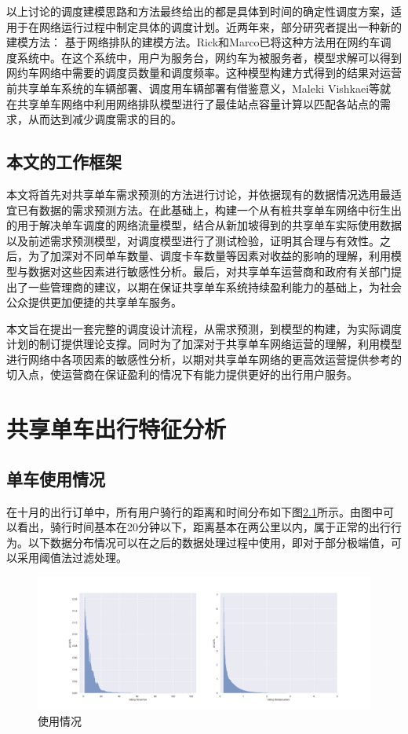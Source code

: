 \documentclass[]{tongjithesis}
\numberwithin{equation}{chapter}
\begin{document}
以上讨论的调度建模思路和方法最终给出的都是具体到时间的确定性调度方案，适用于在网络运行过程中制定具体的调度计划。近两年来，部分研究者提出一种新的建模方法： 基于网络排队的建模方法。Rick和Marco已将这种方法用在网约车调度系统中\cite{zhang2015queueing}。在这个系统中，用户为服务台，网约车为被服务者，模型求解可以得到网约车网络中需要的调度员数量和调度频率。这种模型构建方式得到的结果对运营前共享单车系统的车辆部署、调度用车辆部署有借鉴意义，Maleki Vishkaei等就在共享单车网络中利用网络排队模型进行了最佳站点容量计算以匹配各站点的需求，从而达到减少调度需求的目的\cite{vishkaei2020balancing}。

\section{本文的工作框架}
本文将首先对共享单车需求预测的方法进行讨论，并依据现有的数据情况选用最适宜已有数据的需求预测方法。在此基础上，构建一个从有桩共享单车网络中衍生出的用于解决单车调度的网络流量模型，结合从新加坡得到的共享单车实际使用数据以及前述需求预测模型，对调度模型进行了测试检验，证明其合理与有效性。之后，为了加深对不同单车数量、调度卡车数量等因素对收益的影响的理解，利用模型与数据对这些因素进行敏感性分析。最后，对共享单车运营商和政府有关部门提出了一些管理商的建议，以期在保证共享单车系统持续盈利能力的基础上，为社会公众提供更加便捷的共享单车服务。

本文旨在提出一套完整的调度设计流程，从需求预测，到模型的构建，为实际调度计划的制订提供理论支撑。同时为了加深对于共享单车网络运营的理解，利用模型进行网络中各项因素的敏感性分析，以期对共享单车网络的更高效运营提供参考的切入点，使运营商在保证盈利的情况下有能力提供更好的出行用户服务。

\clearpage
\chapter{共享单车出行特征分析}
\section{单车使用情况}

在十月的出行订单中，所有用户骑行的距离和时间分布如下图\ref{distime}所示。由图中可以看出，骑行时间基本在20分钟以下，距离基本在两公里以内，属于正常的出行行为。以下数据分布情况可以在之后的数据处理过程中使用，即对于部分极端值，可以采用阈值法过滤处理。
\begin{figure}[H]
	\centering
	\includegraphics[width= 1.0 \textwidth]{figures_main/dis_time.png}
	\caption{使用情况}
	\label{distime}
\end{figure}
\end{document}
